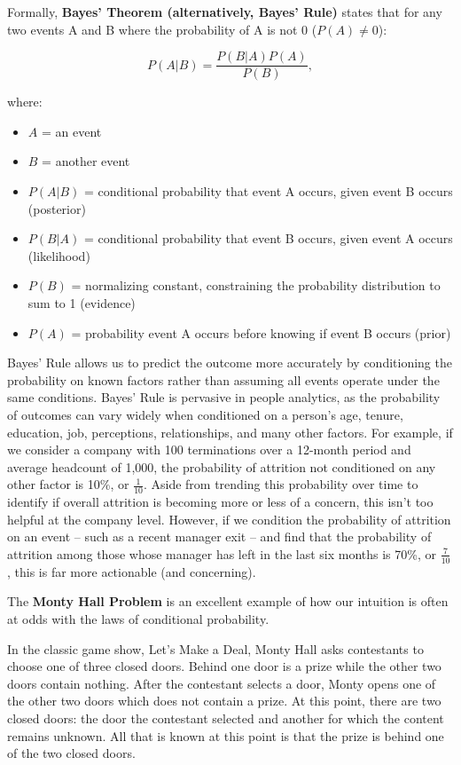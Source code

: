 \documentclass[]{book}
\providecommand{\tightlist}{%
  \setlength{\itemsep}{0pt}\setlength{\parskip}{0pt}}
\begin{document}
Formally, \textbf{Bayes' Theorem (alternatively, Bayes' Rule)} states that for any two events A and B where the probability of A is not 0 (\(P(A) \neq 0\)):

\[ P(A \vert B) = \frac{P(B \vert A) P(A)}{P(B)}, \]

where:

\begin{itemize}
\tightlist
\item
  \(A\) = an event
\item
  \(B\) = another event
\item
  \(P(A|B)\) = conditional probability that event A occurs, given event B occurs (posterior)
\item
  \(P(B|A)\) = conditional probability that event B occurs, given event A occurs (likelihood)
\item
  \(P(B)\) = normalizing constant, constraining the probability distribution to sum to 1 (evidence)
\item
  \(P(A)\) = probability event A occurs before knowing if event B occurs (prior)
\end{itemize}

Bayes' Rule allows us to predict the outcome more accurately by conditioning the probability on known factors rather than assuming all events operate under the same conditions. Bayes' Rule is pervasive in people analytics, as the probability of outcomes can vary widely when conditioned on a person's age, tenure, education, job, perceptions, relationships, and many other factors. For example, if we consider a company with 100 terminations over a 12-month period and average headcount of 1,000, the probability of attrition not conditioned on any other factor is 10\%, or \(\frac{1}{10}\). Aside from trending this probability over time to identify if overall attrition is becoming more or less of a concern, this isn't too helpful at the company level. However, if we condition the probability of attrition on an event -- such as a recent manager exit -- and find that the probability of attrition among those whose manager has left in the last six months is 70\%, or \(\frac{7}{10}\), this is far more actionable (and concerning).

The \textbf{Monty Hall Problem} is an excellent example of how our intuition is often at odds with the laws of conditional probability.

In the classic game show, Let's Make a Deal, Monty Hall asks contestants to choose one of three closed doors. Behind one door is a prize while the other two doors contain nothing. After the contestant selects a door, Monty opens one of the other two doors which does not contain a prize. At this point, there are two closed doors: the door the contestant selected and another for which the content remains unknown. All that is known at this point is that the prize is behind one of the two closed doors.
\end{document}
